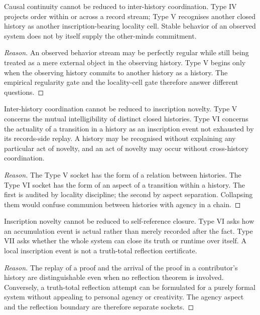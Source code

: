 \begin{lemma}
\label{lem:transcendental-supply-IV-not-V}
Causal continuity cannot be reduced to inter-history coordination. Type IV projects order within or across a record stream; Type V recognises another closed history as another inscription-bearing locality cell. Stable behavior of an observed system does not by itself supply the other-minds commitment.
\end{lemma}

\begin{proof}[Reason]
An observed behavior stream may be perfectly regular while still being treated as a mere external object in the observing history. Type V begins only when the observing history commits to another history as a history. The empirical regularity gate and the locality-cell gate therefore answer different questions.
\end{proof}

\begin{lemma}
\label{lem:transcendental-supply-V-not-VI}
Inter-history coordination cannot be reduced to inscription novelty. Type V concerns the mutual intelligibility of distinct closed histories. Type VI concerns the actuality of a transition in a history as an inscription event not exhausted by its records-side replay. A history may be recognised without explaining any particular act of novelty, and an act of novelty may occur without cross-history coordination.
\end{lemma}

\begin{proof}[Reason]
The Type V socket has the form of a relation between histories. The Type VI socket has the form of an aspect of a transition within a history. The first is audited by locality discipline; the second by aspect separation. Collapsing them would confuse communion between histories with agency in a chain.
\end{proof}

\begin{lemma}
\label{lem:transcendental-supply-VI-not-VII}
Inscription novelty cannot be reduced to self-reference closure. Type VI asks how an accumulation event is actual rather than merely recorded after the fact. Type VII asks whether the whole system can close its truth or runtime over itself. A local inscription event is not a truth-total reflection certificate.
\end{lemma}

\begin{proof}[Reason]
The replay of a proof and the arrival of the proof in a contributor's history are distinguishable even when no reflection theorem is involved. Conversely, a truth-total reflection attempt can be formulated for a purely formal system without appealing to personal agency or creativity. The agency aspect and the reflection boundary are therefore separate sockets.
\end{proof}

